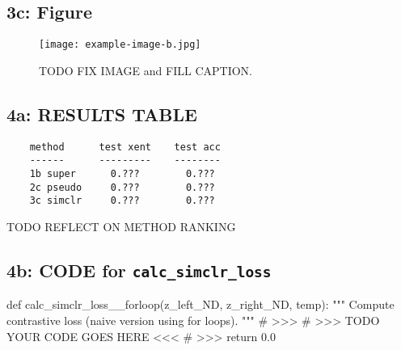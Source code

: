 \documentclass[10pt]{article}
\begin{document}
\newpage

\subsection{3c: Figure}
\renewcommand{\figurename}{Fig.}
\renewcommand{\thefigure}{3c}
 \begin{figure}[!h]
     \centering
     \texttt{[image: example-image-b.jpg]}
     \label{fig:3c}
\caption{
TODO FIX IMAGE and FILL CAPTION.
}%
 \end{figure}

\newpage %
\subsection{4a: RESULTS TABLE}

\begin{verbatim}
    method      test xent    test acc
    ------      ---------    --------
    1b super      0.???        0.???
    2c pseudo     0.???        0.???
    3c simclr     0.???        0.???
\end{verbatim}

TODO REFLECT ON METHOD RANKING


\newpage %
\subsection{4b: CODE for \texttt{calc\_simclr\_loss}}

\begin{python}
def calc_simclr_loss__forloop(z_left_ND, z_right_ND, temp):
    """ Compute contrastive loss (naive version using for loops).
    """
    # >>>
    # >>> TODO YOUR CODE GOES HERE <<<
    # >>>
    return 0.0
\end{python}
\end{document}
